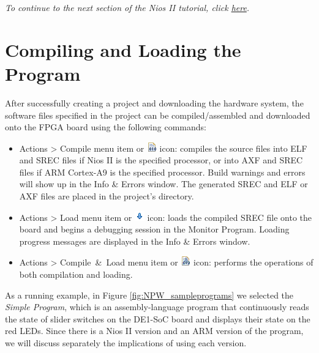 \documentclass[11pt, twoside, pdftex]{article}
\begin{document}
{\it To continue to the next section of the Nios II tutorial, click \hyperref[tut:nios_2]{here}.}


\section{Compiling and Loading the Program}

After successfully creating a project and downloading the
hardware system, the software files specified in the project can
be compiled/assembled and downloaded onto the FPGA board using
the following commands:

\begin{itemize}
\item \textsf{Actions > Compile} menu item or \includegraphics{toolbar/compile.png} 
icon: compiles the source files into ELF and SREC files if
Nios II is the specified processor, or into AXF and SREC files if 
ARM Cortex-A9 is the specified processor. 
Build warnings and errors will show up in the 
\textsf{Info \& Errors} window.
The generated SREC and ELF or AXF files are placed in the project's directory.

\item \textsf{Actions > Load} menu item or \includegraphics{toolbar/load.png} icon:
loads the compiled SREC file onto the board and begins a
debugging session in the Monitor Program. Loading progress
messages are displayed in the \textsf{Info \& Errors} window.

\item \textsf{Actions > Compile~\&~Load} menu item or \includegraphics{toolbar/compile_load.png}
icon: performs the operations of both compilation and loading.
\end{itemize}

As a running example, in Figure \ref{fig:NPW_sampleprograms} we selected the 
{\it Simple Program}, which is an assembly-language program
that continuously reads the state of slider switches on the 
DE1-SoC board and displays their state on the red LEDs. 
Since there is a Nios II version and an ARM version of the
program, we will discuss separately the implications of using
each version.
\end{document}
